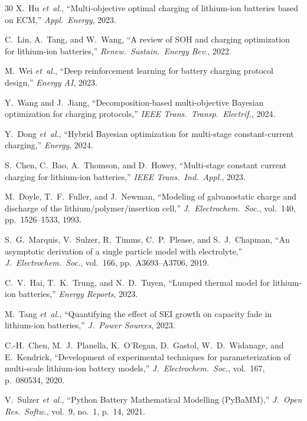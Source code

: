 \documentclass[lettersize,journal]{IEEEtran}
\begin{document}
\begin{thebibliography}{30}
X.~Hu \textit{et~al.}, ``Multi-objective optimal charging of lithium-ion batteries based on ECM,'' \textit{Appl.\ Energy}, 2023.

C.~Lin, A.~Tang, and W.~Wang, ``A review of SOH and charging optimization for lithium-ion batteries,'' \textit{Renew.\ Sustain.\ Energy Rev.}, 2022.

M.~Wei \textit{et~al.}, ``Deep reinforcement learning for battery charging protocol design,'' \textit{Energy AI}, 2023.

Y.~Wang and J.~Jiang, ``Decomposition-based multi-objective Bayesian optimization for charging protocols,'' \textit{IEEE Trans.\ Transp.\ Electrif.}, 2024.

Y.~Dong \textit{et~al.}, ``Hybrid Bayesian optimization for multi-stage constant-current charging,'' \textit{Energy}, 2024.

S.~Chen, C.~Bao, A.~Thomson, and D.~Howey, ``Multi-stage constant current charging for lithium-ion batteries,'' \textit{IEEE Trans.\ Ind.\ Appl.}, 2023.

M.~Doyle, T.~F.~Fuller, and J.~Newman, ``Modeling of galvanostatic charge and discharge of the lithium/polymer/insertion cell,'' \textit{J.\ Electrochem.\ Soc.}, vol.~140, pp.~1526--1533, 1993.

S.~G.~Marquis, V.~Sulzer, R.~Timms, C.~P.~Please, and S.~J.~Chapman, ``An asymptotic derivation of a single particle model with electrolyte,'' \textit{J.\ Electrochem.\ Soc.}, vol.~166, pp.~A3693--A3706, 2019.

C.~V.~Hai, T.~K.~Trung, and N.~D.~Tuyen, ``Lumped thermal model for lithium-ion batteries,'' \textit{Energy Reports}, 2023.

M.~Tang \textit{et~al.}, ``Quantifying the effect of SEI growth on capacity fade in lithium-ion batteries,'' \textit{J.\ Power Sources}, 2023.

C.-H.~Chen, M.~J.~Planella, K.~O'Regan, D.~Gastol, W.~D.~Widanage, and E.~Kendrick, ``Development of experimental techniques for parameterization of multi-scale lithium-ion battery models,'' \textit{J.\ Electrochem.\ Soc.}, vol.~167, p.~080534, 2020.

V.~Sulzer \textit{et~al.}, ``Python Battery Mathematical Modelling (PyBaMM),'' \textit{J.\ Open Res.\ Softw.}, vol.~9, no.~1, p.~14, 2021.


\end{thebibliography}
\end{document}

